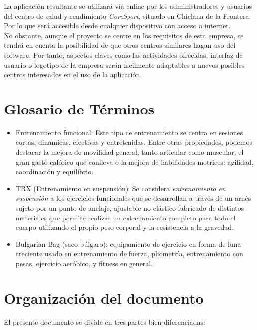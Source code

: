 La aplicación resultante se utilizará vía online por los administradores y usuarios del centro de salud y rendimiento \textsl{CoreSport}, situado en Chiclana de la Frontera. Por lo que será accesible desde cualquier dispositivo con acceso a internet. 
\\

No obstante, aunque el proyecto se centre en los requisitos de esta empresa, se tendrá en cuenta la posibilidad de que otros centros similares hagan uso del software. Por tanto, aspectos claves como las actividades ofrecidas, interfaz de usuario o logotipo de la empresa serán fácilmente adaptables a nuevos posibles centros interesados en el uso de la aplicación. 


\section{Glosario de Términos} 

\begin{itemize} 
\item Entrenamiento funcional: Este tipo de entrenamiento se centra en sesiones cortas, dinámicas, efectivas y entretenidas. Entre otras propiedades, podemos destacar la mejora de movilidad general, tanto articular como muscular, el gran gasto calórico que conlleva o la mejora de habilidades motrices: agilidad, coordinación y equilibrio. 
\item TRX (Entrenamiento en suspensión):  Se considera \textsl{entrenamiento en suspensión} a los ejercicios funcionales que se desarrollan a través de un arnés sujeto por un punto de anclaje, ajustable no elástico fabricado de distintos materiales que permite realizar un entrenamiento completo para todo el cuerpo utilizando el propio peso corporal y la resistencia a la gravedad.
\item Bulgarian Bag (saco búlgaro): equipamiento de ejercicio en forma de luna creciente usado en entrenamiento de fuerza, pliometría, entrenamiento con pesas, ejercicio aeróbico, y fitness en general.
\end {itemize}


\section{Organización del documento}

El presente documento se divide en tres partes bien diferenciadas: 

